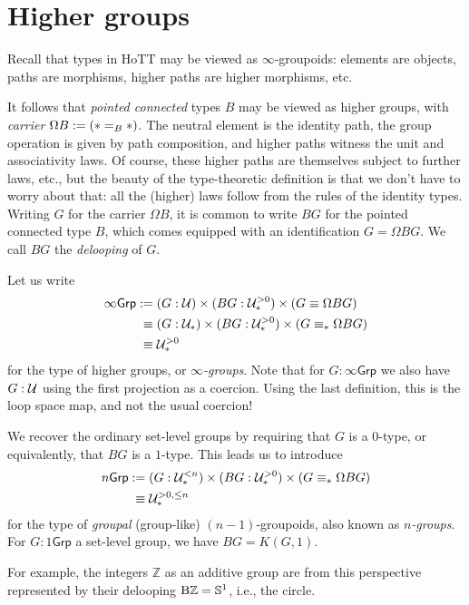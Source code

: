 \section{Higher groups}
\label{sec:higher-groups}

Recall that types in HoTT may be viewed as $\infty$-groupoids:
elements are objects, paths are morphisms, higher paths are higher
morphisms, etc.

It follows that \emph{pointed connected} types $B$ may be viewed as higher
groups, with \emph{carrier} $\Omega B := (\ast =_B \ast)$.
The neutral element is the identity path,
the group operation is given by path composition,
and higher paths witness the unit and associativity laws.
Of course, these higher paths are themselves subject to further laws,
etc., but the beauty of the type-theoretic definition is
that we don't have to worry about that:
all the (higher) laws follow from the rules of the identity types.
Writing $G$ for the carrier $\Omega B$, it is common to write $BG$ for the pointed
connected type $B$, which comes equipped with an identification $G = \Omega BG$.
We call $BG$ the \emph{delooping} of $G$.

Let us write
\begin{align*}
  \infty\mathsf{Grp}
  &:= (G : \mathcal{U}) \times (BG : \mathcal{U}_\ast^{>0}) \times (G \equiv \Omega BG) \\
  &\phantom{:}\equiv (G : \mathcal{U}_\ast) \times (BG : \mathcal{U}_\ast^{>0}) \times (G \equiv_\ast \Omega BG) \\
  &\phantom{:}\equiv \mathcal{U}_\ast^{>0}
\end{align*}
for the type of higher groups, or \emph{$\infty$-groups}.
Note that for $G:\infty\mathsf{Grp}$
we also have $G:\mathcal{U}$ using the first projection as a coercion. Using
the last definition, this is the loop space map, and not the usual coercion!

We recover the ordinary set-level
groups by requiring that $G$ is a $0$-type, or equivalently, that $BG$
is a $1$-type. This leads us to introduce
\begin{align*}
  n\mathsf{Grp}
  &:= (G : \mathcal{U}_\ast^{<n}) \times (BG : \mathcal{U}_\ast^{>0})
    \times (G \equiv_\ast \Omega BG) \\
  &\phantom{:}\equiv \mathcal{U}_\ast^{>0,\le n}
\end{align*}
for the type of \emph{groupal} (group-like) $(n-1)$-groupoids, also known
as \emph{$n$-groups}. For $G:1\mathsf{Grp}$
a set-level group, we have $BG = K(G,1)$.

For example, the integers $\mathbb{Z}$ as an additive group are from this
perspective represented by their delooping $\mathop{\mathrm{B}\mathbb{Z}}={\mathbb{S}}^1$, i.e., the circle.

